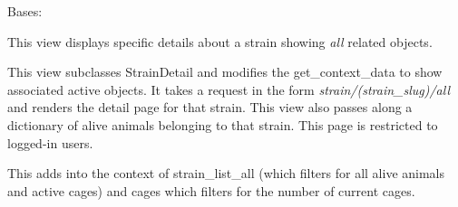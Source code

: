 \documentclass[letterpaper,10pt,english]{sphinxmanual}
\begin{document}

\begin{fulllineitems}
\label{api:mousedb.animal.views.StrainDetailAll}
Bases: {\hyperref[api:mousedb.animal.views.StrainDetail]{}}

This view displays specific details about a strain showing \emph{all} related objects.

This view subclasses StrainDetail and modifies the get\_context\_data to show associated active objects.
It takes a request in the form \emph{strain/(strain\_slug)/all} and renders the detail page for that strain.
This view also passes along a dictionary of alive animals belonging to that strain.
This page is restricted to logged-in users.

\begin{fulllineitems}
\label{api:mousedb.animal.views.StrainDetailAll.get_context_data}
This adds into the context of strain\_list\_all (which filters for all alive animals and active cages) and cages which filters for the number of current cages.

\end{fulllineitems}


\end{fulllineitems}

\end{document}
